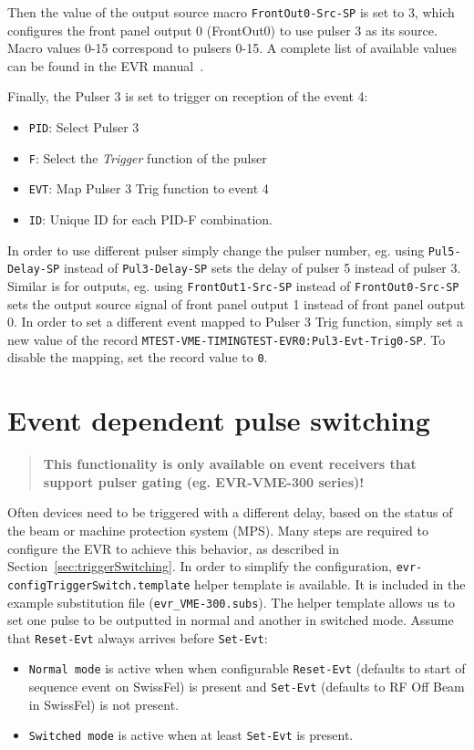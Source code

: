 \documentclass[12pt,a4paper]{article}
\begin{document}
Then the value of the output source macro \texttt{FrontOut0-Src-SP} is set to 3, which configures the front panel output 0 (FrontOut0) to use pulser 3 as its source. Macro values 0-15 correspond to pulsers 0-15. A complete list of available values can be found in the EVR manual~\cite{evr_manual}.

Finally, the Pulser 3 is set to trigger on reception of the event 4:
\begin{itemize}
	\item \texttt{PID}: Select Pulser 3
	\item \texttt{F}: Select the \textit{Trigger} function of the pulser
	\item \texttt{EVT}: Map Pulser 3 Trig function to event 4
	\item \texttt{ID}: Unique ID for each PID-F combination.
\end{itemize}

In order to use different pulser simply change the pulser number, eg. using \texttt{Pul5-Delay-SP} instead of \texttt{Pul3-Delay-SP} sets the delay of pulser 5 instead of pulser 3.
Similar is for outputs, eg. using \texttt{FrontOut1-Src-SP} instead of \texttt{FrontOut0-Src-SP} sets the output source signal of front panel output 1 instead of front panel output 0. In order to set a different event mapped to Pulser 3 Trig function, simply set a new value of the record \texttt{MTEST-VME-TIMINGTEST-EVR0:Pul3-Evt-Trig0-SP}. To disable the mapping, set the record value to \texttt{0}.

\section{Event dependent pulse switching}\label{sec:2pulsers}
\begin{quote}
\textbf{This functionality is only available on event receivers that support pulser gating (eg. EVR-VME-300 series)!}
\end{quote}
Often devices need to be triggered with a different delay, based on the status of the beam or machine protection system (MPS). Many steps are required to configure the EVR to achieve this behavior, as described in Section~\ref{sec:triggerSwitching}. In order to simplify the configuration, \texttt{evr-configTriggerSwitch.template} helper template is available. It is included in the example substitution file (\texttt{evr\_VME-300.subs}). The helper template allows us to set one pulse to be outputted in normal and another in switched mode. Assume that \texttt{Reset-Evt} always arrives before \texttt{Set-Evt}:
\begin{itemize}
\item \texttt{Normal mode} is active when when configurable \texttt{Reset-Evt} (defaults to start of sequence event on SwissFel) is present and \texttt{Set-Evt} (defaults to RF Off Beam in SwissFel) is not present.
\item \texttt{Switched mode} is active when at least \texttt{Set-Evt} is present.
\end{itemize}
\end{document}
